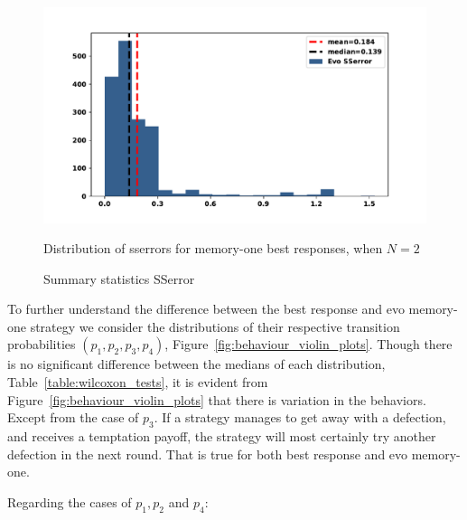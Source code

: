 \documentclass[10pt]{article}
\begin{document}
\begin{figure}[!htbp]
    \begin{minipage}{0.74\textwidth}
            \begin{center}
            \includegraphics[width=\linewidth]{img/evo_sserror.pdf}
            \end{center}
            \caption{Distribution of sserrors for memory-one best responses, when \(N=2\)}
            \label{fig:sserror_mem_one}
    \end{minipage}
    \begin{minipage}{0.24\textwidth}
        \centering
        \captionsetup{type=table}
        \resizebox{.75\columnwidth}{!}{%
            }
            \caption{Summary statistics SSerror}
            \label{table:sserror_stats}
      \end{minipage}
\end{figure}

To further understand the difference between the best response and evo
memory-one strategy we consider the distributions of their respective transition
probabilities \((p_1, p_2, p_3, p_4)\), Figure~\ref{fig:behaviour_violin_plots}.
Though there is no significant difference between the medians of each
distribution, Table~\ref{table:wilcoxon_tests}, it is evident from
Figure~\ref{fig:behaviour_violin_plots} that there is variation in the
behaviors. Except from the case of \(p_3\). If a strategy manages to get away
with a defection, and receives a temptation payoff, the strategy will most
certainly try another defection in the next round. That is true for both best
response and evo memory-one.

Regarding the cases of \(p_1, p_2\) and \(p_4\):
\end{document}
